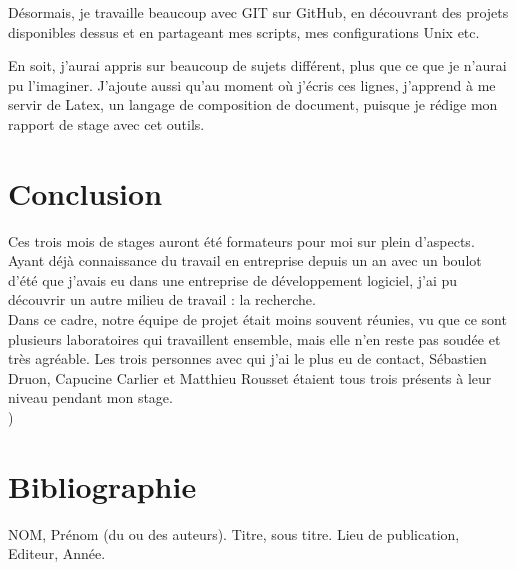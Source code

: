\documentclass[11pt,french,a4paper]{report}
\begin{document}
Désormais, je travaille beaucoup avec GIT sur GitHub, en découvrant des projets disponibles dessus et en partageant mes scripts,
mes configurations Unix etc. 

En soit, j'aurai appris sur beaucoup de sujets différent, plus que ce que je n'aurai pu l'imaginer.
J'ajoute aussi qu'au moment où j'écris ces lignes, j'apprend à me servir de Latex, un langage de composition de document, 
puisque je rédige mon rapport de stage avec cet outils. 


\chapter{Conclusion}

Ces trois mois de stages auront été formateurs pour moi sur plein d'aspects. Ayant déjà connaissance du travail en entreprise depuis un an
avec un boulot d'été que j'avais eu dans une entreprise de développement logiciel, j'ai pu découvrir un autre milieu de travail : 
la recherche. \\
Dans ce cadre, notre équipe de projet était moins souvent réunies, vu que ce sont plusieurs laboratoires qui travaillent ensemble, 
mais elle n'en reste pas soudée et très agréable. Les trois personnes avec qui j'ai le plus eu de contact, Sébastien Druon, 
Capucine Carlier et Matthieu Rousset étaient tous trois présents à leur niveau pendant mon stage.  \\

)


\chapter{Bibliographie}

NOM, Prénom (du ou des auteurs). Titre, sous titre. Lieu de publication, Editeur, Année. 
\end{document}
